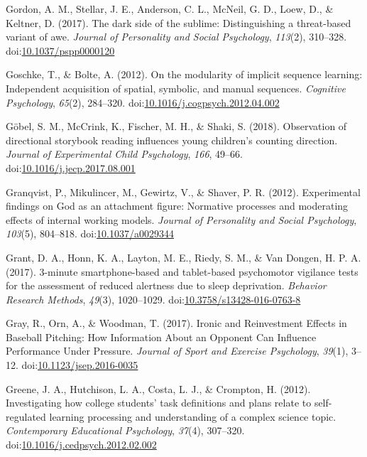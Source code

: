 \documentclass[english,man]{apa6}
\theoremstyle{definition}
\theoremstyle{definition}
\theoremstyle{definition}
\theoremstyle{remark}
\begin{document}
\hypertarget{ref-Gordon2017}{}
Gordon, A. M., Stellar, J. E., Anderson, C. L., McNeil, G. D., Loew, D.,
\& Keltner, D. (2017). The dark side of the sublime: Distinguishing a
threat-based variant of awe. \emph{Journal of Personality and Social
Psychology}, \emph{113}(2), 310--328.
doi:\href{https://doi.org/10.1037/pspp0000120}{10.1037/pspp0000120}

\hypertarget{ref-Goschke2012}{}
Goschke, T., \& Bolte, A. (2012). On the modularity of implicit sequence
learning: Independent acquisition of spatial, symbolic, and manual
sequences. \emph{Cognitive Psychology}, \emph{65}(2), 284--320.
doi:\href{https://doi.org/10.1016/j.cogpsych.2012.04.002}{10.1016/j.cogpsych.2012.04.002}

\hypertarget{ref-Gobel2018}{}
Göbel, S. M., McCrink, K., Fischer, M. H., \& Shaki, S. (2018).
Observation of directional storybook reading influences young children's
counting direction. \emph{Journal of Experimental Child Psychology},
\emph{166}, 49--66.
doi:\href{https://doi.org/10.1016/j.jecp.2017.08.001}{10.1016/j.jecp.2017.08.001}

\hypertarget{ref-Granqvist}{}
Granqvist, P., Mikulincer, M., Gewirtz, V., \& Shaver, P. R. (2012).
Experimental findings on God as an attachment figure: Normative
processes and moderating effects of internal working models.
\emph{Journal of Personality and Social Psychology}, \emph{103}(5),
804--818. doi:\href{https://doi.org/10.1037/a0029344}{10.1037/a0029344}

\hypertarget{ref-Grant2017a}{}
Grant, D. A., Honn, K. A., Layton, M. E., Riedy, S. M., \& Van Dongen,
H. P. A. (2017). 3-minute smartphone-based and tablet-based psychomotor
vigilance tests for the assessment of reduced alertness due to sleep
deprivation. \emph{Behavior Research Methods}, \emph{49}(3), 1020--1029.
doi:\href{https://doi.org/10.3758/s13428-016-0763-8}{10.3758/s13428-016-0763-8}

\hypertarget{ref-Gray2016}{}
Gray, R., Orn, A., \& Woodman, T. (2017). Ironic and Reinvestment
Effects in Baseball Pitching: How Information About an Opponent Can
Influence Performance Under Pressure. \emph{Journal of Sport and
Exercise Psychology}, \emph{39}(1), 3--12.
doi:\href{https://doi.org/10.1123/jsep.2016-0035}{10.1123/jsep.2016-0035}

\hypertarget{ref-Greene2012}{}
Greene, J. A., Hutchison, L. A., Costa, L. J., \& Crompton, H. (2012).
Investigating how college students' task definitions and plans relate to
self-regulated learning processing and understanding of a complex
science topic. \emph{Contemporary Educational Psychology}, \emph{37}(4),
307--320.
doi:\href{https://doi.org/10.1016/j.cedpsych.2012.02.002}{10.1016/j.cedpsych.2012.02.002}
\end{document}

